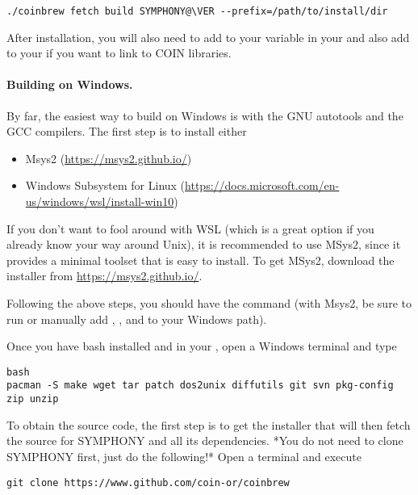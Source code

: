 {\color{brown}
\begin{verbatim}
./coinbrew fetch build SYMPHONY@\VER --prefix=/path/to/install/dir
\end{verbatim}
}

After installation, you will also need to add  to your
 variable in your  and also add 
to your  if you want to link to COIN libraries. 

\paragraph{Building on Windows.}

By far, the easiest way to build on Windows is with the GNU autotools and the
GCC compilers. The first step is to install either
\begin{itemize}
\item Msys2 (\url{https://msys2.github.io/})
\item Windows Subsystem for Linux (\url{https://docs.microsoft.com/en-us/windows/wsl/install-win10})
\end{itemize}
If you don't want to fool around with
WSL (which is a great option if you already know your way around Unix), it is
recommended to use MSys2, since it provides a minimal toolset that is easy to
install. To get MSys2, download the installer from
\url{https://msys2.github.io/}.

Following the above steps, you should have the  command
(with Msys2, be sure to run  
or manually add , ,
and 
 to your Windows path).   

Once you have bash installed and in your , open a Windows terminal and
type 

{\color{brown}
\begin{verbatim}
bash
pacman -S make wget tar patch dos2unix diffutils git svn pkg-config zip unzip
\end{verbatim}
}

To obtain the source code, the first step is to get the installer that will then
fetch the source for SYMPHONY and all its dependencies. *You do not need to
clone SYMPHONY first, just do the following!* Open a terminal and execute

{\color{brown}
\begin{verbatim}
git clone https://www.github.com/coin-or/coinbrew
\end{verbatim}
}

